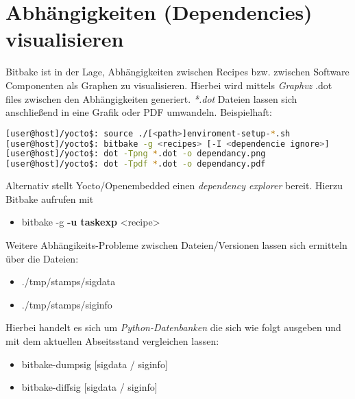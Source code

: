 

\section{Abhängigkeiten (Dependencies) visualisieren }%
\label{sec:abhangigkeiten_dependencies_visualisieren_}
Bitbake ist in der Lage, Abhängigkeiten zwischen Recipes bzw. zwischen Software
Componenten als Graphen zu visualisieren. Hierbei wird mittels \textit{Graphvz}
{.dot} files zwischen den Abhängigkeiten generiert. \textit{*.dot} Dateien
lassen sich anschließend in eine Grafik oder PDF umwandeln. Beispielhaft:


\begin{lstlisting}[frame=single,language=bash,caption={Dependency Graph}]
[user@host]/yocto$: source ./[<path>]enviroment-setup-*.sh
[user@host]/yocto$: bitbake -g <recipes> [-I <dependencie ignore>]
[user@host]/yocto$: dot -Tpng *.dot -o dependancy.png
[user@host]/yocto$: dot -Tpdf *.dot -o dependancy.pdf
\end{lstlisting}

Alternativ stellt Yocto/Openembedded einen \textit{dependency explorer} bereit.
Hierzu Bitbake aufrufen mit
\begin{itemize}
    \item bitbake -g \textbf{-u taskexp} <recipe>
\end{itemize}

Weitere Abhängikeits-Probleme zwischen Dateien/Versionen lassen sich ermitteln
über die Dateien:
\begin{itemize}
    \item ./tmp/stamps/sigdata
    \item ./tmp/stamps/siginfo
\end{itemize}

Hierbei handelt es sich um \textit{Python-Datenbanken} die sich wie folgt
ausgeben und mit dem aktuellen Abseitsstand vergleichen lassen:

\begin{itemize}
    \item bitbake-dumpsig [sigdata / siginfo]
    \item bitbake-diffsig [sigdata / siginfo]
\end{itemize}




